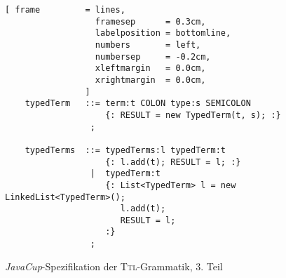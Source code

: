 \begin{figure}[!ht]
\centering
\begin{Verbatim}[ frame         = lines, 
                  framesep      = 0.3cm, 
                  labelposition = bottomline,
                  numbers       = left,
                  numbersep     = -0.2cm,
                  xleftmargin   = 0.0cm,
                  xrightmargin  = 0.0cm,
                ]
    typedTerm   ::= term:t COLON type:s SEMICOLON 
                    {: RESULT = new TypedTerm(t, s); :}
                 ;
    
    typedTerms  ::= typedTerms:l typedTerm:t 
                    {: l.add(t); RESULT = l; :}
                 |  typedTerm:t 
                    {: List<TypedTerm> l = new LinkedList<TypedTerm>(); 
                       l.add(t); 
                       RESULT = l; 
                    :}
                 ;
\end{Verbatim}
\vspace*{-0.3cm}
\caption{\textsl{JavaCup}-Spezifikation der \textsc{Ttl}-Grammatik, 3. Teil}
\label{fig:typeChecker.cup-3}
\end{figure}

